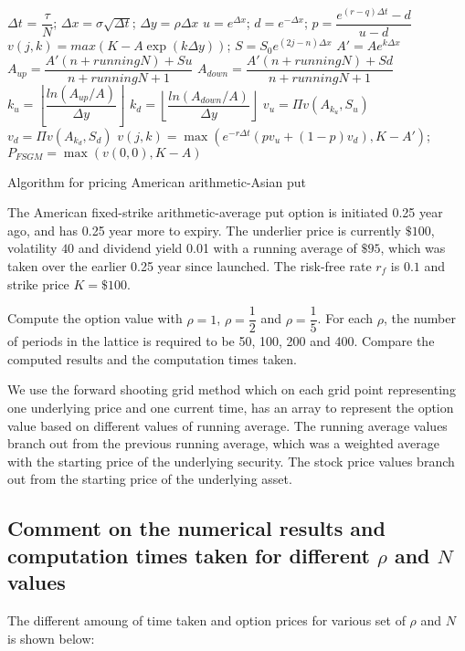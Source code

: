 \begin{algorithm}[H]
	$\Delta t$ = $\dfrac{\tau}{N}$;
	$\Delta x = \sigma \sqrt{\Delta t}$;
	$\Delta y = \rho \Delta x$\;
	$u = e^{\Delta x}$;
	$d = e^{-\Delta x}$;
	$p = \dfrac{e^{(r-q) \Delta t} - d}{u - d}$\;
	 {
		 {
			$v(j, k) = max(K - A \exp(k \Delta y))$;
		}
	}
	 {
		 {
			 {
				$S = S_{0} e^{(2j - n) \Delta x}$\;
				$A' = A e^{k \Delta x}$\;
				$A_{up} = \dfrac{A' (n + runningN) + Su}{n + runningN + 1}$\;
				$A_{down} = \dfrac{A' (n + runningN) + Sd}{n + runningN + 1}$\;
				$k_{u} = \left\lfloor\dfrac{ln(A_{up}/{A})}{\Delta y}\right\rfloor$\;
				$k_{d} = \left\lfloor\dfrac{ln(A_{down}/{A})}{\Delta y}\right\rfloor$\;
				$v_{u} = \Pi v(A_{k_{u}}, S_{u})$\;
				$v_{d} = \Pi v(A_{k_{d}}, S_{d})$\;
				$v(j,k) = \max(e^{-r \Delta t} (pv_{u} + (1-p)v_{d}), K - A')$;
			}
		}
	}
	$P_{FSGM} = \max(v(0,0), K - A)$\;
\caption{Algorithm for pricing American arithmetic-Asian put}
\end{algorithm}

The American fixed-strike arithmetic-average put option is initiated 0.25 year ago, and has 0.25 year more to expiry. The underlier price is currently $\$100$, volatility $40$ and dividend yield 0.01 with a running average of $\$95$, which was taken over the earlier 0.25 year since launched. The risk-free rate $r_f$ is $0.1$ and strike price $K=
\$100$.

Compute the option value with $\rho=1$, $\rho=\dfrac{1}{2}$ and $\rho = \dfrac{1}{5}$. For each $\rho$, the number of periods in the lattice is required to be 50, 100, 200 and 400. Compare the computed results and the computation times taken.

We use the forward shooting grid method which on each grid point representing one underlying price and one current time, has an array to represent the option value based on different values of running average. The running average values branch out from the previous running average, which was a weighted average with the starting price of the underlying security. The stock price values branch out from the starting price of the underlying asset.

\subsection{Comment on the numerical results and computation times taken for different $\rho$ and $N$ values}
The different amoung of time taken and option prices for various set of $\rho$ and $N$ is shown below:


